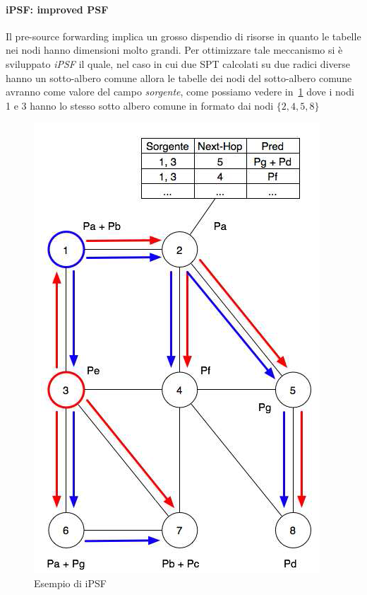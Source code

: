 \paragraph{iPSF: improved PSF}
Il pre-source forwarding implica un grosso dispendio di risorse in quanto le tabelle nei nodi hanno dimensioni molto grandi. Per ottimizzare tale meccanismo si è sviluppato \emph{iPSF} il quale, nel caso in cui due SPT calcolati su due radici diverse hanno un sotto-albero comune allora le tabelle dei nodi del sotto-albero comune avranno come valore del campo \emph{sorgente}, come possiamo vedere in \figurename\,\ref{img:ipsf} dove i nodi 1 e 3 hanno lo stesso sotto albero comune in formato dai nodi $\{2,4,5,8\}$
\begin{figure}
\centering
\includegraphics[scale=0.5]{img/ipsf.png}
\caption{Esempio di iPSF}\label{img:ipsf}
\end{figure}
